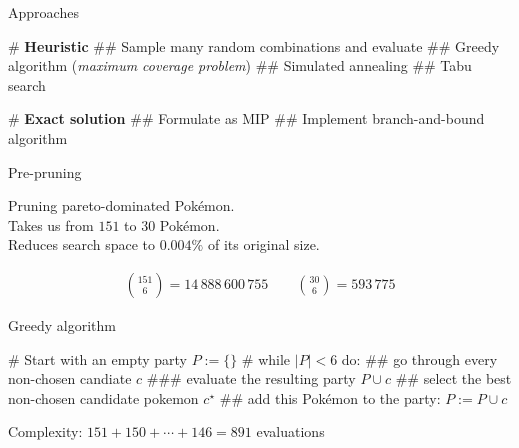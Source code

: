 \documentclass[12pt, aspectratio=149]{beamer}
\theoremstyle{plain}
\begin{document}
\begin{frame}[fragile]{Approaches}
	
	\begin{easylist}[itemize]
		# \textbf{Heuristic}
		## Sample many random combinations and evaluate
		## Greedy algorithm (\emph{maximum coverage problem})
		## Simulated annealing
		## Tabu search
		
		# \textbf{Exact solution}
		## Formulate as MIP
		## Implement branch-and-bound algorithm
	\end{easylist}
\end{frame}

\begin{frame}[fragile]{Pre-pruning}
	\begin{figure}
		\centering
	\end{figure}
	
	\begin{center}
		Pruning pareto-dominated Pokémon. \\
		Takes us from $151$ to $30$ Pokémon.\\
		Reduces search space to $0.004 \%$ of its original size.
	\end{center}
	
	\begin{align*}
	\binom{151}{6} = 14\,888\,600\,755 \qquad \binom{30}{6} = 593\,775
	\end{align*}
\end{frame}


\begin{frame}[fragile]{Greedy algorithm}
	
\begin{figure}
	\centering
\end{figure}
	
\begin{easylist}[itemize]
	# Start with an empty party $P := \{\}$
	# while $|P| < 6$ do:
	## go through every non-chosen candiate $c$
	### evaluate the resulting party $P \cup c$
	## select the best non-chosen candidate pokemon $c^\star$
	## add this Pokémon to the party: $P := P \cup c$
\end{easylist}
\vspace*{1em}
Complexity: $151 + 150 + \cdots + 146 = 891$ evaluations
\end{frame}
\end{document}

